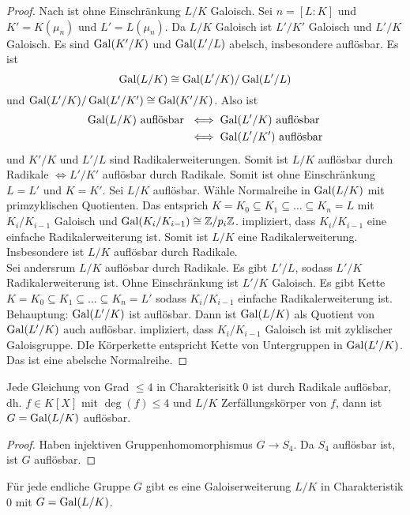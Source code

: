 \begin{proof}
    Nach  ist ohne Einschränkung \(L/K\) Galoisch.
    Sei \(n=[L:K]\) und \(K'=K(\mu_n)\) und \(L'=L(\mu_n)\).
    Da \(L/K\) Galoisch ist \(L'/K'\) Galoisch und \(L'/K\) Galoisch. Es sind \(\operatorname{Gal}(K'/K)\) und \(\operatorname{Gal}(L'/L)\) abelsch, insbesondere auflösbar.
    Es ist \[\operatorname{Gal}(L/K)\cong \operatorname{Gal}(L'/K)/\operatorname{Gal}(L'/L)\] und \(\operatorname{Gal}(L'/K)/\operatorname{Gal}(L'/K')\cong \operatorname{Gal}(K'/K)\).
    Also ist \begin{align*}
        \operatorname{Gal}(L/K)\text{ auflösbar }&\iff \operatorname{Gal}(L'/K) \text{ auflösbar}\\
        &\iff \operatorname{Gal}(L'/K') \text{ auflösbar}
    \end{align*}
    und \(K'/K\) und \(L'/L\) sind Radikalerweiterungen. Somit ist \(L/K\) auflösbar durch Radikale \(\iff L'/K'\) auflösbar durch Radikale. Somit ist ohne Einschränkung \(L=L'\) und \(K=K'\).
    Sei \(L/K\) auflösbar. Wähle Normalreihe in \(\operatorname{Gal}(L/K)\) mit primzyklischen Quotienten. Das entsprich \(K=K_0\subseteq K_1\subseteq\dots\subseteq K_n=L\) mit \(K_i/K_{i-1}\) Galoisch und \(\operatorname{Gal}(K_i/K_{i-1})\cong \mathbb{Z}/p_i\mathbb{Z}\).   impliziert, dass \(K_i/K_{i-1}\) eine einfache Radikalerweiterung ist. Somit ist \(L/K\) eine Radikalerweiterung. Insbesondere ist \(L/K\) auflösbar durch Radikale.\\
    Sei andersrum \(L/K\) auflösbar durch Radikale. Es gibt \(L'/L\), sodass \(L'/K\) Radikalerweiterung ist. Ohne Einschränkung ist \(L'/K\) Galoisch. Es gibt Kette \(K=K_0\subseteq K_1\subseteq\dots\subseteq K_n=L'\) sodass \(K_i/K_{i-1}\) einfache Radikalerweiterung ist.
    Behauptung: \(\operatorname{Gal}(L'/K)\) ist auflösbar. Dann ist \(\operatorname{Gal}(L/K)\) als Quotient von \(\operatorname{Gal}(L'/K)\) auch auflösbar.
     impliziert, dass \(K_i/K_{i-1}\) Galoisch ist mit zyklischer Galoisgruppe. DIe Körperkette entspricht Kette von Untergruppen in \(\operatorname{Gal}(L'/K)\). Das ist eine abelsche Normalreihe.
\end{proof}
\begin{Kor}
    Jede Gleichung von Grad \(\leq 4\) in Charakterisitk \(0\) ist durch Radikale auflösbar, dh. \(f\in K[X]\) mit \(\deg(f)\leq 4\) und \(L/K\) Zerfällungskörper von \(f\), dann ist \(G=\operatorname{Gal}(L/K)\) auflösbar.
\end{Kor}
\begin{proof}
    Haben injektiven Gruppenhomomorphismus \(G\to S_4\). Da \(S_4\) auflösbar ist, ist \(G\) auflösbar.
\end{proof}
\begin{Satz}
    Für jede endliche Gruppe \(G\) gibt es eine Galoiserweiterung \(L/K\) in Charakteristik \(0\) mit \(G=\operatorname{Gal}(L/K)\).
\end{Satz}
